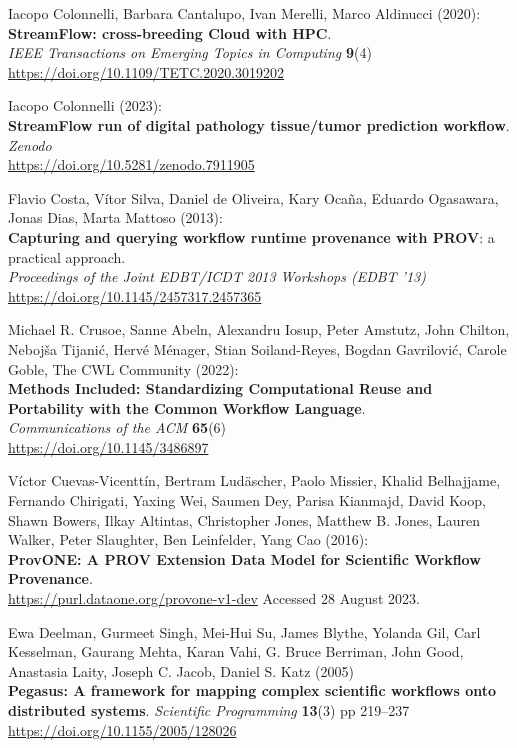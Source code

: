 \documentclass[10pt,letterpaper]{article}
\begin{document}
\begin{thebibliography}{10}
\begin{small}
Iacopo Colonnelli, Barbara Cantalupo, Ivan Merelli, Marco Aldinucci (2020):\\
\textbf{StreamFlow: cross-breeding Cloud with HPC}.\\
\emph{IEEE Transactions on Emerging Topics in Computing} \textbf{9}(4)\\
\url{https://doi.org/10.1109/TETC.2020.3019202}

Iacopo Colonnelli (2023):\\
\textbf{StreamFlow run of digital pathology tissue/tumor prediction workflow}.\\
\emph{Zenodo}\\
\url{https://doi.org/10.5281/zenodo.7911905}

Flavio Costa, Vítor Silva, Daniel de Oliveira, Kary Ocaña, Eduardo Ogasawara, Jonas Dias, Marta Mattoso (2013):\\
\textbf{Capturing and querying workflow runtime provenance with PROV}: a practical approach.\\
\emph{Proceedings of the Joint EDBT/ICDT 2013 Workshops (EDBT '13)}\\
\url{https://doi.org/10.1145/2457317.2457365} 

Michael R. Crusoe, Sanne Abeln, Alexandru Iosup, Peter Amstutz, John Chilton, Nebojša Tijanić, Hervé Ménager, Stian Soiland-Reyes, Bogdan Gavrilović, Carole Goble, The CWL Community
(2022):\\
\textbf{Methods Included: Standardizing Computational Reuse and
Portability with the Common Workflow Language}.\\
\emph{Communications of the ACM} \textbf{65}(6)\\
\url{https://doi.org/10.1145/3486897}

Víctor Cuevas-Vicenttín, Bertram Ludäscher, Paolo Missier, Khalid Belhajjame, Fernando Chirigati, Yaxing Wei, Saumen Dey, Parisa Kianmajd, David Koop, Shawn Bowers, Ilkay Altintas, Christopher Jones, Matthew B. Jones, Lauren Walker, Peter Slaughter, Ben Leinfelder, Yang Cao (2016):\\
\textbf{ProvONE: A PROV Extension Data Model for Scientific Workflow Provenance}.\\
\url{https://purl.dataone.org/provone-v1-dev}
Accessed 28 August 2023.

Ewa Deelman, Gurmeet Singh, Mei-Hui Su, James Blythe, Yolanda Gil, Carl Kesselman, Gaurang Mehta, Karan Vahi, G. Bruce Berriman, John Good, Anastasia Laity, Joseph C. Jacob, Daniel S. Katz (2005)\\
\textbf{Pegasus: A framework for mapping complex scientific workflows onto distributed systems}.
\emph{Scientific Programming} \textbf{13}(3) pp 219–237\\
\url{https://doi.org/10.1155/2005/128026}


\end{small}
\end{thebibliography}
\end{document}
